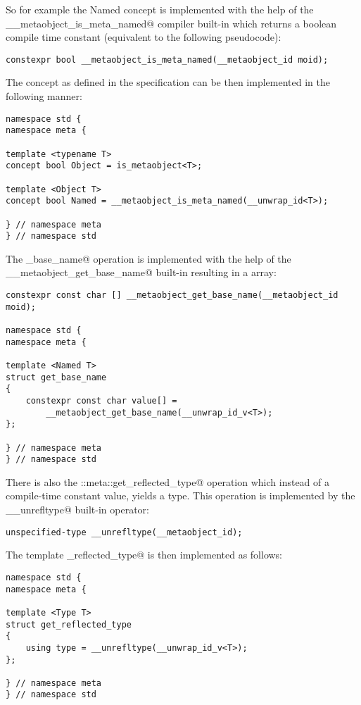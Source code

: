 So for example the Named concept is implemented with the help of
the \verb@__metaobject_is_meta_named@ compiler built-in which returns a boolean
compile time constant (equivalent to the following pseudocode):

\begin{verbatim}
constexpr bool __metaobject_is_meta_named(__metaobject_id moid);
\end{verbatim}

The concept as defined in the specification can be then implemented in the
following manner: 

\begin{verbatim}
namespace std {
namespace meta {

template <typename T>
concept bool Object = is_metaobject<T>;

template <Object T>
concept bool Named = __metaobject_is_meta_named(__unwrap_id<T>);

} // namespace meta
} // namespace std
\end{verbatim}

The \verb@get_base_name@ operation is implemented with the help of the
\verb@__metaobject_get_base_name@ built-in resulting in a \verb@constexpr@
\verb@char@ array: 

\begin{verbatim}
constexpr const char [] __metaobject_get_base_name(__metaobject_id moid);

namespace std {
namespace meta {

template <Named T>
struct get_base_name
{
	constexpr const char value[] =
		__metaobject_get_base_name(__unwrap_id_v<T>);
};

} // namespace meta
} // namespace std
\end{verbatim}

There is also the \verb@std::meta::get_reflected_type@ operation which instead
of a compile-time constant value, yields a type. This operation is implemented
by the \verb@__unrefltype@ built-in operator:

\begin{verbatim}
unspecified-type __unrefltype(__metaobject_id);
\end{verbatim}

The template \verb@get_reflected_type@ is then implemented as follows:

\begin{verbatim}
namespace std {
namespace meta {

template <Type T>
struct get_reflected_type
{
	using type = __unrefltype(__unwrap_id_v<T>);
};

} // namespace meta
} // namespace std
\end{verbatim}

